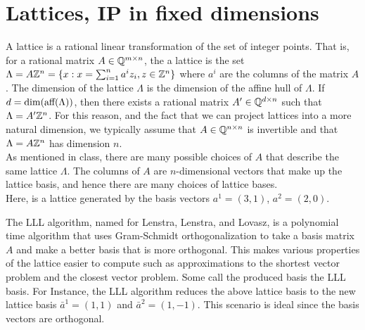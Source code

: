 \chapter{Lattices, IP in fixed dimensions}
A lattice is a rational linear transformation of the set of integer points.  That is, for a rational matrix $A \in {\mathbb{Q}}^{m \times n}$, the a lattice is the set $\Lambda = A{\mathbb{Z}}^n = \{x :  x = \sum_{i=1}^n a^i z_i, z \in {\mathbb{Z}}^n\}$ where $a^i$ are the columns of the matrix $A$.  
The dimension of the lattice $\Lambda$ is the dimension of the affine hull of $\Lambda$.  If $d = \dim({\textup{aff}}(\Lambda))$, then there exists a rational matrix $A' \in {\mathbb{Q}}^{d\times n}$ such that $\Lambda = A'{\mathbb{Z}}^n$.  
For this reason, and the fact that we can project lattices into a more natural dimension, we typically assume that $A \in {\mathbb{Q}}^{n\times n}$ is invertible and that $\Lambda  = A{\mathbb{Z}}^n$ has dimension $n$.  \\
As mentioned in class, there are many possible choices of $A$ that describe the same lattice $\Lambda$.  The columns of $A$ are $n$-dimensional vectors that make up the lattice basis, and hence there are many choices of lattice bases.  \\
Here, is a lattice generated by the basis vectors $a^1= (3,1)$, $a^2 = (2,0)$.
\begin{center}
\end{center}
The LLL algorithm, named for Lenstra, Lenstra, and Lovasz, is a polynomial time algorithm that uses Gram-Schmidt orthogonalization to take a basis matrix $A$ and make a better basis that is more orthogonal.  This makes various properties of the lattice easier to compute such as approximations to the shortest vector problem and the closest vector problem.  Some call the produced basis the LLL basis.   For Instance, the LLL algorithm reduces the above lattice basis to the new lattice basis $\bar a^1 = (1,1)$ and $\bar a^2 = (1,-1)$.   This scenario is ideal since the  basis vectors are orthogonal.
